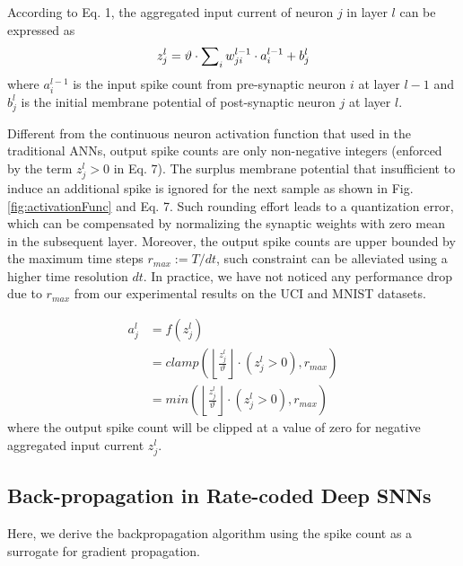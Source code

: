 \documentclass[conference]{IEEEtran}
\begin{document}
According to Eq. 1, the aggregated input current of neuron $j$ in layer $l$ can be expressed as
\begin{equation}
z_j^l = \vartheta  \cdot \sum\nolimits_i {w_{ji}^{l - 1} \cdot a_i^{l - 1}} + b_j^l \\
\end{equation}
where $a_i^{l - 1}$ is the input spike count from pre-synaptic neuron $i$ at layer $l-1$ and $b_j^l$ is the initial membrane potential of post-synaptic neuron $j$ at layer $l$.

Different from the continuous neuron activation function that used in the traditional ANNs,
output spike counts are only non-negative integers (enforced by the term  $z_j^l > 0$ in Eq. 7). The surplus membrane potential that insufficient to induce an additional spike is ignored for the next sample as shown in Fig. \ref{fig:activationFunc} and Eq. 7. Such rounding effort leads to a quantization error, which can be compensated by normalizing the synaptic weights with zero mean in the subsequent layer. Moreover, the output spike counts are upper bounded by the maximum time steps $r_{max} := T/dt$, such constraint can be alleviated using a higher time resolution $dt$. In practice, we have not noticed any performance drop due to $r_{max}$ from our experimental results on the UCI and MNIST datasets.

\begin{equation}
\begin{aligned}
a_j^l &= f(z_j^l) \\
&= clamp\left(\left\lfloor {\frac{{z_j^l}}{{\vartheta}}} \right\rfloor \cdot\left( {z_j^l > 0} \right), r_{max} \right)\\
&= min\left(\left\lfloor {\frac{{z_j^l}}{{\vartheta}}} \right\rfloor \cdot\left( {z_j^l > 0} \right), r_{max} \right)
\end{aligned}
\end{equation}
where the output spike count will be clipped at a value of zero for negative aggregated input current $z_j^l$.

\subsection{Back-propagation in Rate-coded Deep SNNs}
Here, we derive the backpropagation algorithm using the spike count as a surrogate for gradient propagation.
\end{document}
